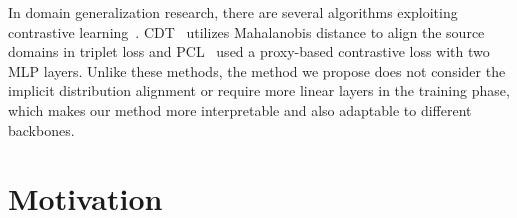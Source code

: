 \documentclass[a4paper,fleqn]{cas-dc}
\begin{document}
In domain generalization research, there are several algorithms exploiting contrastive learning~\cite{CDT, pcl}. CDT~\cite{CDT} utilizes Mahalanobis distance to align the source domains in triplet loss and PCL~\cite{pcl} used a proxy-based contrastive loss with two MLP layers. Unlike these methods, the method we propose does not consider the implicit distribution alignment or require more linear layers in the training phase, which makes our method more interpretable and also adaptable to different backbones. \section{Motivation}
\label{sec: Motivation}
\begin{figure*}
\end{figure*}
\end{document}
